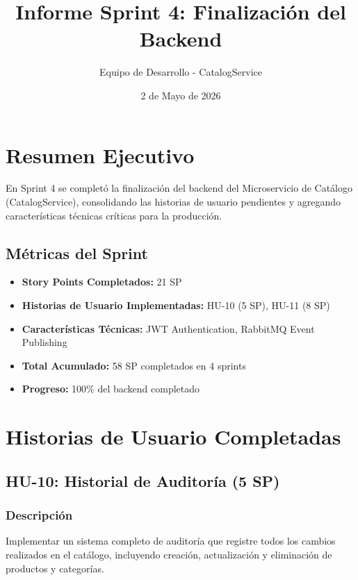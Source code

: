 \documentclass[12pt,a4paper]{article}
\title{\textbf{Informe Sprint 4: Finalización del Backend}}
\author{Equipo de Desarrollo - CatalogService}
\date{2 de Mayo de 2026}
\begin{document}
\maketitle

\tableofcontents
\newpage

\section{Resumen Ejecutivo}

En Sprint 4 se completó la finalización del backend del Microservicio de Catálogo (CatalogService), consolidando las historias de usuario pendientes y agregando características técnicas críticas para la producción.

\subsection{Métricas del Sprint}

\begin{itemize}
    \item \textbf{Story Points Completados:} 21 SP
    \item \textbf{Historias de Usuario Implementadas:} HU-10 (5 SP), HU-11 (8 SP)
    \item \textbf{Características Técnicas:} JWT Authentication, RabbitMQ Event Publishing
    \item \textbf{Total Acumulado:} 58 SP completados en 4 sprints
    \item \textbf{Progreso:} 100\% del backend completado
\end{itemize}

\section{Historias de Usuario Completadas}

\subsection{HU-10: Historial de Auditoría (5 SP)}

\subsubsection{Descripción}

Implementar un sistema completo de auditoría que registre todos los cambios realizados en el catálogo, incluyendo creación, actualización y eliminación de productos y categorías.
\end{document}
